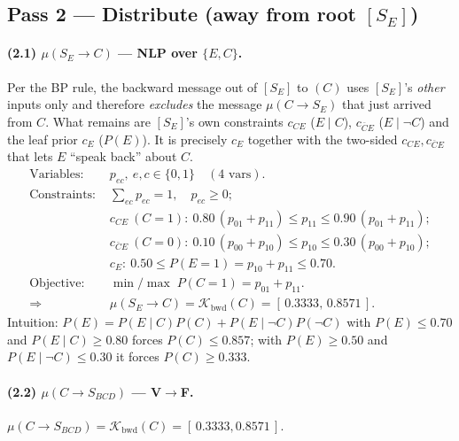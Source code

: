 \documentclass[11pt]{article}
\newcommand{\cK}{\mathcal{K}}
\newcommand{\bwd}{\mathrm{bwd}}
\begin{document}
\subsection{Pass 2 --- Distribute (away from root $[S_E]$)}

\paragraph{(2.1) $\mu(S_E\!\to\!C)$ --- NLP over $\{E,C\}$.}
Per the BP rule, the backward message out of $[S_E]$ to $(C)$ uses $[S_E]$'s
\emph{other} inputs only and therefore \emph{excludes} the message
$\mu(C\!\to\!S_E)$ that just arrived from $C$. What remains are $[S_E]$'s own
constraints $c_{CE}$ ($E\mid C$), $c_{\bar C E}$ ($E\mid\neg C$) and the leaf
prior $c_E$ ($P(E)$). It is precisely $c_E$ together with the two-sided
$c_{CE},c_{\bar C E}$ that lets $E$ ``speak back'' about $C$.
\begin{align*}
  \text{Variables: } & p_{ec},\ e,c\in\{0,1\}\quad(4\text{ vars}).\\
  \text{Constraints: } & \textstyle\sum_{ec}p_{ec}=1,\quad p_{ec}\ge0;\\
                       & c_{CE}\ (C{=}1):\ 0.80\,(p_{01}{+}p_{11})\le p_{11}\le 0.90\,(p_{01}{+}p_{11});\\
                       & c_{\bar C E}\ (C{=}0):\ 0.10\,(p_{00}{+}p_{10})\le p_{10}\le 0.30\,(p_{00}{+}p_{10});\\
                       & c_E:\ 0.50 \le P(E{=}1)=p_{10}{+}p_{11}\le 0.70.\\
  \text{Objective: } & \min/\max\; P(C{=}1)=p_{01}{+}p_{11}.\\
  \Rightarrow\;& \mu(S_E\!\to\!C)=\cK_\bwd(C)=[\,0.3333,\,0.8571\,].
\end{align*}
Intuition: $P(E)=P(E\mid C)P(C)+P(E\mid\neg C)P(\neg C)$ with $P(E)\le 0.70$
and $P(E\mid C)\ge 0.80$ forces $P(C)\le 0.857$; with $P(E)\ge 0.50$ and
$P(E\mid\neg C)\le 0.30$ it forces $P(C)\ge 0.333$.

\paragraph{(2.2) $\mu(C\!\to\!S_{BCD})$ --- V$\to$F.}
$\mu(C\!\to\!S_{BCD})=\cK_\bwd(C)=[\,0.3333,0.8571\,]$.
\end{document}
